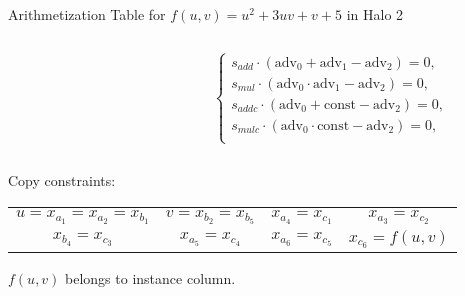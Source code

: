 \documentclass{beamer}
\begin{document}
\begin{frame}{Arithmetization Table for $f(u, v) = u^2 + 3uv + v + 5$ in Halo 2}
\begin{columns}
\begin{column}{0.5\textwidth}
\begin{center}
				\end{center}
			\end{column}
			\begin{column}{0.4\textwidth}
					\begin{equation*}
					\begin{cases}
						s_{add} \cdot (\text{adv}_0 + \text{adv}_1 - \text{adv}_2) = 0,\\ 
						s_{mul} \cdot (\text{adv}_0 \cdot \text{adv}_1 - \text{adv}_2) = 0,\\
						s_{addc} \cdot (\text{adv}_0 + \text{const} - \text{adv}_2) = 0,\\ 
						s_{mulc} \cdot (\text{adv}_0 \cdot \text{const} - \text{adv}_2) = 0,\\ 
					\end{cases}
				\end{equation*}
			\end{column}
		\end{columns}\pause
		
		Copy constraints:
		\begin{tabular}{cccc}
			$u = x_{a_1} = x_{a_2} = x_{b_1}$ & $v = x_{b_2} = x_{b_5}$ &$x_{a_4} = x_{c_1}$ & $x_{a_3} = x_{c_2}$\\ 
			$x_{b_4} = x_{c_3}$ & $x_{a_5} = x_{c_4}$ & $x_{a_6} = x_{c_5}$ & $x_{c_6} = f(u,v)$
		\end{tabular}\pause
		
		$f(u, v)$ belongs to instance column.
	\end{frame}
\end{document}
